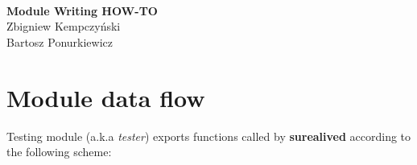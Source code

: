 \documentclass[polish,12pt]{article}
\begin{document}
\thispagestyle{empty}
~
\vspace{8em}
~
\begin{center}
\end{center}
\begin{center}
  \textbf{\Large Module Writing HOW-TO}\\
  \vspace{2em}
  \large
  Zbigniew Kempczyński\\
  Bartosz Ponurkiewicz
\end{center}
\newpage

\tableofcontents
\newpage
\section{Module data flow}
Testing module (a.k.a \textit{tester}) exports functions called by \textbf{surealived}
according to the following scheme:
\begin{center}
\end{center}

\newpage
\end{document}
